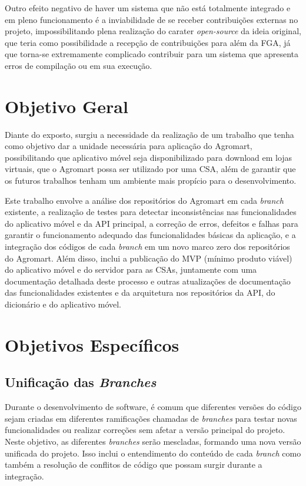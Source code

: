 Outro efeito negativo de haver um sistema que não está totalmente integrado e em pleno funcionamento é a inviabilidade de se receber contribuições externas no projeto, impossibilitando plena realização do carater \textit{open-source} da ideia original, que teria como possibilidade a recepção de contribuições para além da FGA, já que torna-se extremamente complicado contribuir para um sistema que apresenta erros de compilação ou em sua execução.

\section{Objetivo Geral}
Diante do exposto, surgiu a necessidade da realização de um trabalho que tenha como objetivo dar a unidade necessária para aplicação do Agromart, possibilitando que aplicativo móvel seja disponibilizado para download em lojas virtuais, que o Agromart possa ser utilizado por uma CSA, além de garantir que os futuros trabalhos tenham um ambiente mais propício para o desenvolvimento.

Este trabalho envolve a análise dos repositórios do Agromart em cada \textit{branch} existente, a realização de testes para detectar inconsistências nas funcionalidades do aplicativo móvel e da API principal, a correção de erros, defeitos e falhas para garantir o funcionamento adequado das funcionalidades básicas da aplicação, e a integração dos códigos de cada \textit{branch} em um novo marco zero dos repositórios do Agromart. Além disso, inclui a publicação do MVP (mínimo produto viável) do aplicativo móvel e do servidor para as CSAs, juntamente com uma documentação detalhada deste processo e outras atualizações de documentação das funcionalidades existentes e da arquitetura nos repositórios da API, do dicionário e do aplicativo móvel.

\section{Objetivos Específicos}
\subsection{Unificação das \textit{Branches}}
Durante o desenvolvimento de software, é comum que diferentes versões do código sejam criadas em diferentes ramificações chamadas de \textit{branches} para testar novas funcionalidades ou realizar correções sem afetar a versão principal do projeto. Neste objetivo, as diferentes \textit{branches} serão mescladas, formando uma nova versão unificada do projeto. Isso inclui o entendimento do conteúdo de cada \textit{branch} como também a resolução de conflitos de código que possam surgir durante a integração.


